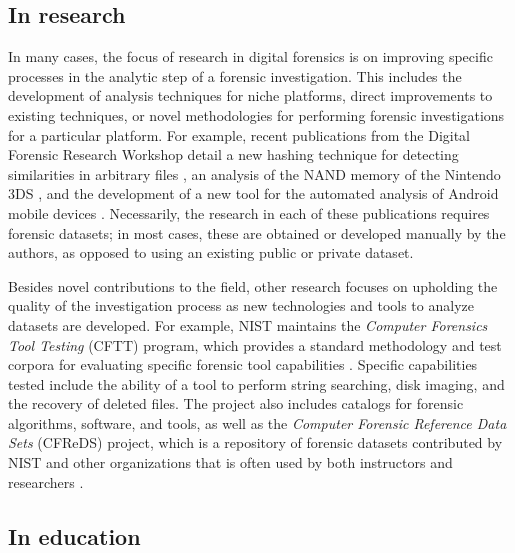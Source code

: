 \documentclass[letterpaper,12pt]{report}
\begin{document}
\subsection{In research}\label{in-research}

In many cases, the focus of research in digital forensics is on
improving specific processes in the analytic step of a forensic
investigation. This includes the development of analysis techniques for
niche platforms, direct improvements to existing techniques, or novel
methodologies for performing forensic investigations for a particular
platform. For example, recent publications from the Digital Forensic
Research Workshop detail a new hashing technique for detecting
similarities in arbitrary files \cite{changFbHashNewSimilarity2019},
an analysis of the NAND memory of the Nintendo 3DS
\cite{pessolanoForensicAnalysisNintendo2019}, and the development of
a new tool for the automated analysis of Android mobile devices
\cite{linAutomatedForensicAnalysis2018}. Necessarily, the research
in each of these publications requires forensic datasets; in most cases,
these are obtained or developed manually by the authors, as opposed to
using an existing public or private dataset.

Besides novel contributions to the field, other research focuses on
upholding the quality of the investigation process as new technologies
and tools to analyze datasets are developed. For example, NIST maintains
the \emph{Computer Forensics Tool Testing} (CFTT) program, which
provides a standard methodology and test corpora for evaluating specific
forensic tool capabilities
\cite{nationalinstituteofstandardsandtechnologyComputerForensicsTool2017}.
Specific capabilities tested include the ability of a tool to perform
string searching, disk imaging, and the recovery of deleted files. The
project also includes catalogs for forensic algorithms, software, and
tools, as well as the \emph{Computer Forensic Reference Data Sets}
(CFReDS) project, which is a repository of forensic datasets contributed
by NIST and other organizations that is often used by both instructors
and researchers
\cite{nationalinstituteofstandardsandtechnologyCFReDSPortal}.

\subsection{In education}\label{in-education}
\end{document}
